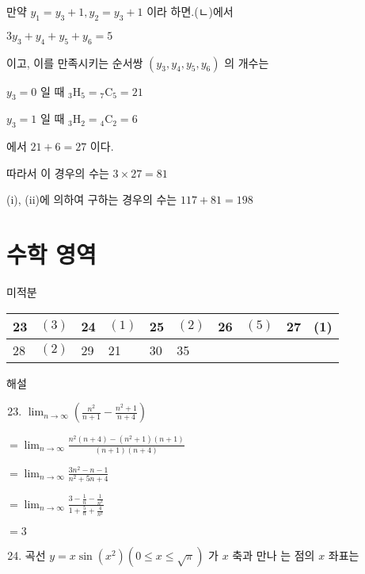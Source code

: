 \documentclass[10pt]{article}
\begin{document}
만약 \(y_{1}=y_{3}+1, y_{2}=y_{3}+1\) 이라 하면.(ㄴ)에서

\(3 y_{3}+y_{4}+y_{5}+y_{6}=5\)

이고, 이를 만족시키는 순서쌍 \(\left(y_{3}, y_{4}, y_{5}, y_{6}\right)\) 의 개수는

\(y_{3}=0\) 일 때 \({ }_{3} \mathrm{H}_{5}={ }_{7} \mathrm{C}_{5}=21\)

\(y_{3}=1\) 일 때 \({ }_{3} \mathrm{H}_{2}={ }_{4} \mathrm{C}_{2}=6\)

에서 \(21+6=27\) 이다.

따라서 이 경우의 수는 \(3 \times 27=81\)

(i), (ii)에 의하여 구하는 경우의 수는 \(117+81=198\)

\section*{수학 영역}
미적분

\begin{center}
\begin{tabular}{|l|l|l|l|l|l|l|l|l|l|}
\hline
23 & \((3)\) & 24 & \((1)\) & 25 & \((2)\) & 26 & \((5)\) & 27 & (1) \\
\hline
28 & \((2)\) & 29 & 21 & 30 & 35 &  &  &  &  \\
\hline
\end{tabular}
\end{center}

해설

\begin{enumerate}
  \setcounter{enumi}{22}
  \item \(\lim _{n \rightarrow \infty}\left(\frac{n^{2}}{n+1}-\frac{n^{2}+1}{n+4}\right)\)
\end{enumerate}

\(=\lim _{n \rightarrow \infty} \frac{n^{2}(n+4)-\left(n^{2}+1\right)(n+1)}{(n+1)(n+4)}\)

\(=\lim _{n \rightarrow \infty} \frac{3 n^{2}-n-1}{n^{2}+5 n+4}\)

\(=\lim _{n \rightarrow \infty} \frac{3-\frac{1}{n}-\frac{1}{n^{2}}}{1+\frac{5}{n}+\frac{4}{n^{2}}}\)

\(=3\)

\begin{enumerate}
  \setcounter{enumi}{23}
  \item 곡선 \(y=x \sin \left(x^{2}\right)(0 \leq x \leq \sqrt{\pi})\) 가 \(x\) 축과 만나 는 점의 \(x\) 좌표는
\end{enumerate}
\end{document}
